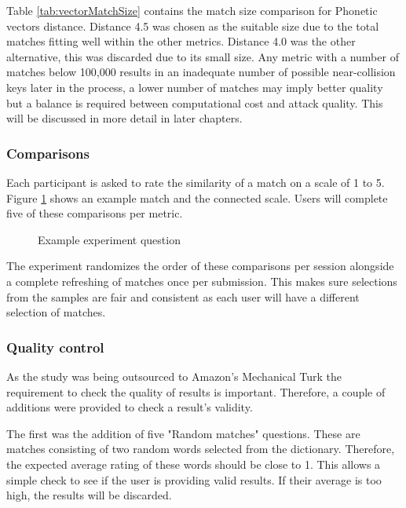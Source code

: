 Table \ref{tab:vectorMatchSize} contains the match size comparison for Phonetic vectors distance. Distance 4.5 was chosen as the suitable size due to the total matches fitting well within the other metrics. Distance 4.0 was the other alternative, this was discarded due to its small size. Any metric with a number of matches below 100,000 results in an inadequate number of possible near-collision keys later in the process, a lower number of matches may imply better quality but a balance is required between computational cost and attack quality. This will be discussed in more detail in later chapters.


\subsubsection{Comparisons}
Each participant is asked to rate the similarity of a match on a scale of 1 to 5. Figure \ref{fig:phoneticMatch} shows an example match and the connected scale. Users will complete five of these comparisons per metric.

\begin{figure}[h!]
    \centering
    \caption{Example experiment question}
    \label{fig:phoneticMatch}
\end{figure}

The experiment randomizes the order of these comparisons per session alongside a complete refreshing of matches once per submission. This makes sure selections from the samples are fair and consistent as each user will have a different selection of matches.

\subsubsection{Quality control}
\label{sec:exp1_qualitycontrol}
As the study was being outsourced to Amazon's Mechanical Turk the requirement to check the quality of results is important. Therefore, a couple of additions were provided to check a result's validity.

The first was the addition of five "Random matches" questions. These are matches consisting of two random words selected from the dictionary. Therefore, the expected average rating of these words should be close to 1. This allows a simple check to see if the user is providing valid results. If their average is too high, the results will be discarded.

